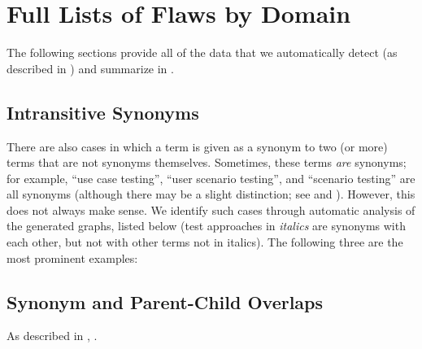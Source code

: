 \section{Full Lists of Flaws by Domain}\label{flawDmn-full}

The following sections provide all of the data that we automatically detect
(as described in ) and summarize in .

\subsection{Intransitive Synonyms}\label{multiSyns}
There are also cases in which a term is given as a synonym to two (or more)
terms that are not synonyms themselves. Sometimes, these terms
\emph{are} synonyms; for example, \citetISTQB{} 
``use case testing'', ``user scenario testing'', and ``scenario testing'' are
all synonyms (although there may be a slight distinction; see
 and ).
%
%
%
%
However, this does not always make sense. We identify \multiSynCount{}
such cases through automatic analysis of the generated graphs\ifnotpaper,
listed below (test approaches in \emph{italics} are synonyms with each other,
but not with other terms not in italics)\else. The following three are the most prominent examples\fi:

\begin{enumerate}
    
\end{enumerate}

\subsection{Synonym and Parent-Child Overlaps}\label{parSyns-full}
As described in , \parSynIntro*{}.
\begin{landscape}
    
\end{landscape}
